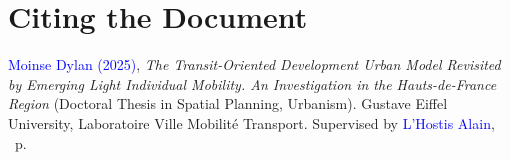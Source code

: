 
\cleardoublepage
\section*{Citing the Document
    \label{body:citer-document}
    }

\small{\textcolor{blue}{Moinse Dylan (2025)}, \textsl{The Transit-Oriented Development Urban Model Revisited by Emerging Light Individual Mobility. An Investigation in the Hauts-de-France Region} (Doctoral Thesis in Spatial Planning, Urbanism). Gustave Eiffel University, Laboratoire Ville Mobilité Transport. Supervised by \textcolor{blue}{L'Hostis Alain}, \pageref{LastPage}~p.}